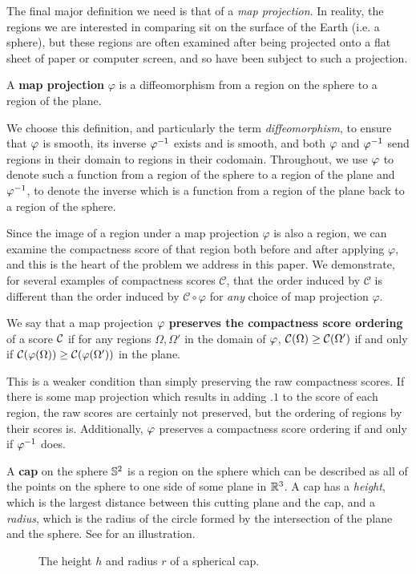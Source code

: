 The final major definition we need is that of a \textit{map
projection}.  In reality, the regions we are interested in comparing
sit on the surface of the Earth (i.e. a sphere), but these regions are
often examined after being projected onto a flat sheet of paper or
computer screen, and so have been subject to such a projection.

\begin{definition}
  A \textbf{map projection} $\varphi$ is a 
  diffeomorphism from a region on the sphere to a region of the 
  plane. 
\end{definition}

We choose this definition, and particularly the term \textit{diffeomorphism}, to ensure that $\varphi$ is smooth, its inverse $\varphi^{-1}$ exists and is smooth, and both $\varphi$ and $\varphi^{-1}$ send regions in their domain to regions in their codomain.  Throughout, we use $\varphi$ to denote such a function from a region of the sphere 
to a region of the plane and $\varphi^{-1}$, to denote the inverse which is a function from a region of the plane back to a region of the sphere.


Since the image of a region under a map projection $\varphi$ is also
a region, we can examine the compactness score of that region both 
before and after applying $\varphi$, and this is the heart of the
problem we address in this paper.  We demonstrate, for several
examples of compactness scores $\mathcal{C}$, that the order
induced by $\mathcal{C}$ is different than the order induced by
$\mathcal{C}\circ\varphi$ for \textit{any} choice of map projection
$\varphi$.

\begin{definition}
  We say that a map projection $\varphi$ \textbf{preserves the  
  compactness score ordering} of a score $\mathcal{C}$ if for any regions 
  $\Omega,\Omega'$ in the domain of $\varphi$, $\mathcal{C}(\Omega)\ge \mathcal{C}(\Omega')$ 
  if and only if $\mathcal{C}(\varphi(\Omega)) \ge \mathcal{C}(\varphi(\Omega'))$ in the plane.
\end{definition}

   This is a weaker condition than simply preserving the raw compactness scores. 
   If there is some map projection which results in adding $.1$ to the score of each region, the raw scores are certainly not preserved, but the ordering of regions by their scores is. Additionally, $\varphi$ preserves a compactness score ordering 
  if and only if $\varphi^{-1}$ does.



\begin{definition}
  A 
  \textbf{cap} on the sphere  $\mathbb{S}^2$ is a region on the sphere
 which can be described as all of the points on the sphere to one side of some plane 
 in $\mathbb{R}^3$.  A cap has a \textit{height}, which is the largest distance between this cutting plane and the cap, and a \textit{radius}, which is the radius of the circle formed by the intersection of the plane and the sphere.  See  for an illustration.
\end{definition}


\begin{figure}[h]
  \centering
  
  \caption{ The height $h$ and radius $r$ of a spherical cap. }
  \label{fig:caphr}
\end{figure}





